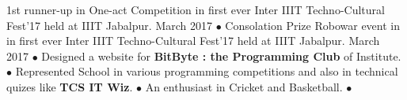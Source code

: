 \begin{cvhonors}
  
  \cvhonor
    {\small 1st  runner-up }
    {\small in One-act Competition in first ever Inter IIIT Techno-Cultural Fest’17 held at IIIT Jabalpur.}
    {\small March 2017}
    {$\bullet$}
  \cvhonor
    {\small Consolation Prize }
    {\small Robowar event in in first ever Inter IIIT Techno-Cultural Fest’17 held at IIIT Jabalpur.}
    {\small March 2017}
    {$\bullet$}
  \cvhonor
    {}
    {\small Designed a website for \textbf{BitByte : the Programming Club} of Institute.}
    {}
    {$\bullet$}
  \cvhonor
    {}
    {\small Represented School in various programming competitions and also in technical quizes like \textbf{TCS IT Wiz}.}
    {}
    {$\bullet$}
  \cvhonor
    {}
    {\small An enthusiast in Cricket and Basketball.}
    {}
    {$\bullet$}
\end{cvhonors}

